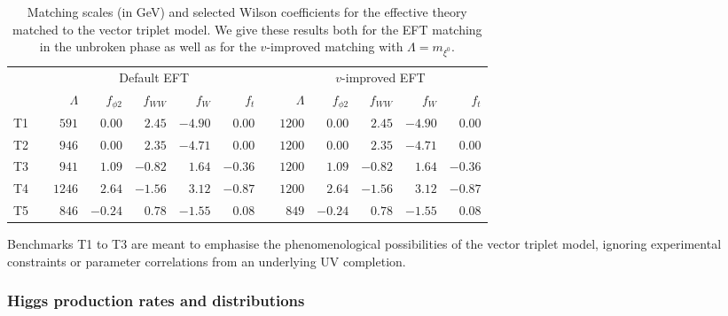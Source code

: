 \begin{table}
  \begin{tabular}{c c rrrrr c rrrrr}
    \toprule
    \multirow{2}{*}{} && \multicolumn{5}{c}{Default EFT}
    && \multicolumn{5}{c}{$v$-improved EFT} \\
    \cmidrule{3-7} \cmidrule{9-13}
    && $\Lambda$ & $f_{\phi 2}$ & $f_{WW}$ & $f_W$ & $f_{t}$
    && $\Lambda$ & $f_{\phi 2}$ & $f_{WW}$ & $f_W$ & $f_{t}$\\
    \midrule
    T1 && $591$ & $0.00$ & $2.45$ & $-4.90$ & $0.00$ 
        && $1200$ & $0.00$ & $2.45$ & $-4.90$ & $0.00$ \\
    T2 && $946$ & $0.00$ & $2.35$ & $-4.71$ & $0.00$
         && $1200$ & $0.00$ & $2.35$ & $-4.71$ & $0.00$ \\
    T3 && $941$ & $1.09$ & $-0.82$ & $1.64$ & $-0.36$ 
         && $1200$ & $1.09$ & $-0.82$ & $1.64$ & $-0.36$  \\
    T4 && $1246$ & $2.64$ & $-1.56$ & $3.12$ & $-0.87$
         && $1200$ & $2.64$ & $-1.56$ & $3.12$ & $-0.87$ \\
    T5 && $846$ & $-0.24$ & $0.78$ & $-1.55$ & $0.08$ 
         && $849$ & $-0.24$ & $0.78$ & $-1.55$ & $0.08$ \\
    \bottomrule
    \end{tabular}
    \caption[EFT description for the vector triplet benchmarks]{Matching
      scales (in GeV) and selected Wilson coefficients for the effective
      theory matched to the vector triplet model. We give these results both
      for the EFT matching in the unbroken phase as well as for the
      $v$-improved matching with $\Lambda = m_{\xi^0}$.}
  \label{tbl:validity_vector_triplet_eft}
\end{table}

Benchmarks T1 to T3 are meant to emphasise the phenomenological
possibilities of the vector triplet model, ignoring experimental
constraints or parameter correlations from an underlying UV
completion.



\subsubsection{Higgs production rates and distributions}


